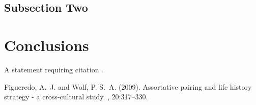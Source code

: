 \documentclass[twoside]{article}
\begin{document}
\blindtext %

\subsection{Subsection Two}

\blindtext %


\section{Conclusions}

A statement requiring citation \cite{Figueredo:2009dg}.
\blindtext %



\begin{thebibliography}{99} %

Figueredo, A.~J. and Wolf, P. S.~A. (2009).
\newblock Assortative pairing and life history strategy - a cross-cultural
  study.
, 20:317--330.
 
\end{thebibliography}

\end{document}
